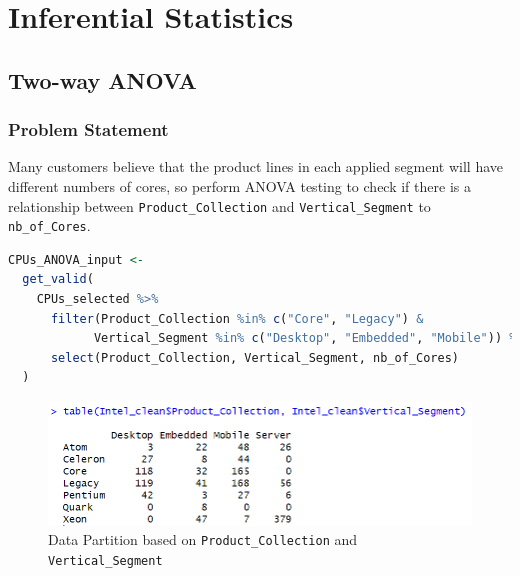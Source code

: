 \chapter{Inferential Statistics}

\section{Two-way ANOVA}
\subsection{Problem Statement}

Many customers believe that the product lines in each applied segment will have different numbers of cores, so perform ANOVA testing to check if there is a relationship between \texttt{Product\_Collection} and \texttt{Vertical\_Segment} to \texttt{nb\_of\_Cores}.

\begin{lstlisting}[language = R]
  CPUs_ANOVA_input <-
  get_valid(
    CPUs_selected %>%
      filter(Product_Collection %in% c("Core", "Legacy") &
            Vertical_Segment %in% c("Desktop", "Embedded", "Mobile")) %>%
      select(Product_Collection, Vertical_Segment, nb_of_Cores)
  ) 
\end{lstlisting}

\begin{figure}[ht]
  \centering
  \includegraphics[width=14cm]{img/1.png}
  \vspace{0.5cm}
  \caption{Data Partition based on \texttt{Product\_Collection} and \texttt{Vertical\_Segment}}
\end{figure}

